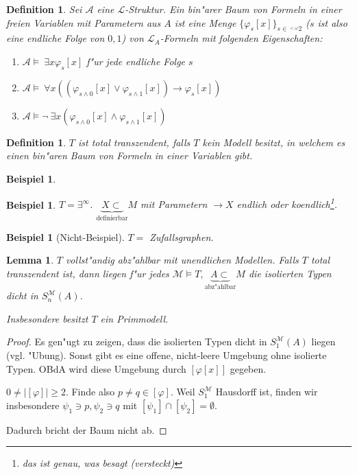\documentclass[a4paper,12pt,numbers=noenddot,parskip=full]{scrartcl}
\newcommand{\Forall}{~\forall}
\newcommand{\Exists}{~\exists}
\newcommand{\scrL}{\mathcal{L}}
\newcommand{\scrA}{\mathcal{A}}
\newcommand{\scrM}{\mathcal{M}}
\theoremstyle{dotless}
\newtheorem{lemma}[theorem]{Lemma}
\newtheorem{definition}[theorem]{Definition}
\newtheorem{example}[theorem]{Beispiel}
\begin{document}
\begin{definition}
	Sei $\scrA$ eine $\scrL$-Struktur. Ein bin"arer Baum von Formeln in einer freien Variablen mit Parametern aus $A$ ist eine Menge $\{\varphi_s [x]\}_{s \in \phantom{}^{<\omega}2}$ ($s$ ist also eine endliche Folge von $0,1$) von $\scrL_A$-Formeln mit folgenden Eigenschaften:
	\begin{enumerate}
		\item $\scrA \models \Exists x \varphi_s[x]$ f"ur jede endliche Folge $s$
		\item $\scrA \models \Forall x ((\varphi_{s \land 0}[x] \lor \varphi_{s \land 1}[x])\rightarrow \varphi_s[x])$
		\item $\scrA \models \lnot \Exists x (\varphi_{s \land 0}[x] \land \varphi_{s \land 1}[x])$
	\end{enumerate}
\end{definition}
\begin{definition}
	$T$ ist \emph{total transzendent}, falls $T$ kein Modell besitzt, in welchem es einen bin"aren Baum von Formeln in einer Variablen gibt.
\end{definition}
\begin{example}
\end{example}
\begin{example}
	$T = \exists^\infty$. $\underbrace{X \subset}_\text{definierbar} M$ mit Parametern $\longrightarrow X$ endlich oder koendlich\footnote{das ist genau, was  besagt (versteckt)}.
\end{example}
\begin{example}[Nicht-Beispiel]
	$T =$ Zufallsgraphen. %
\end{example}
\begin{lemma}
	$T$ vollst"andig abz"ahlbar mit unendlichen Modellen. Falls $T$ total transzendent ist, dann liegen f"ur jedes $\scrM \models T, \underbrace{A \subset}_\text{abz"ahlbar} M$ die isolierten Typen dicht in $S_n^\scrM(A)$.
	
	Insbesondere besitzt $T$ ein Primmodell.
\end{lemma}
\begin{proof}
	Es gen"ugt zu zeigen, dass die isolierten Typen dicht in $S_1^\scrM(A)$ liegen (vgl. "Ubung). %
	Sonst gibt es eine offene, nicht-leere Umgebung ohne isolierte Typen. OBdA wird diese Umgebung durch $[\varphi[x]]$ gegeben.
	
	$0 \neq |[\varphi]| \geq 2$. Finde also $p \neq q \in [\varphi]$. Weil $S_1^\scrM$ Hausdorff ist, finden wir insbesondere $\psi_1 \ni p, \psi_2 \ni q$ mit $[\psi_1] \cap [\psi_2] = \emptyset$.
	
	Dadurch bricht der Baum nicht ab. %
\end{proof}
\end{document}
